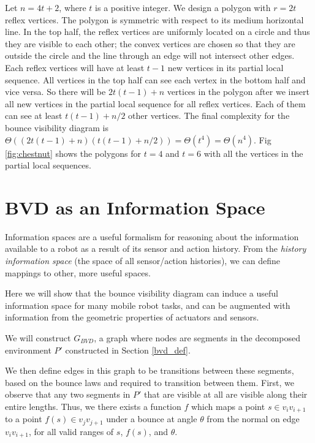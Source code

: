 \documentclass[]{article}  %
\begin{document}
Let $n = 4t+2$, where $t$ is a positive integer. We design a polygon with
$r = 2t$ reflex vertices. The polygon is symmetric with respect to its medium
horizontal line. In the top half, the reflex vertices are uniformly located on a
circle and thus they are visible to each other; the convex vertices are chosen
so that they are outside the circle and the line through an edge will not
intersect other edges. Each reflex vertices will have at least $t-1$ new
vertices in its partial local sequence. All vertices in the top half can see
each vertex in the bottom half and vice versa. So there will be $2t(t-1)+n$
vertices in the polygon after we insert all new vertices in the partial local
sequence for all reflex vertices. Each of them can see at least $t(t-1)+n/2$
other vertices. The final complexity for the bounce visibility diagram is
$\Theta ((2t(t-1)+n)(t(t-1)+n/2)) = \Theta (t^4) = \Theta(n^4)$.
Fig \ref{fig:chestnut} shows the polygons for $t = 4$ and $t=6$ with all the
vertices in the partial local sequences. %



\section{BVD as an Information Space \label{bvd_info}}

Information spaces \cite{tovar2005information} are a useful formalism for
reasoning about the information available to a robot as a result of its sensor
and action history. From the \emph{history information space} (the space of all
sensor/action histories), we can define mappings to other, more useful spaces.

Here we will show that the bounce visibility diagram can induce a useful
information space for many mobile robot tasks, and can be augmented with
information from the geometric properties of actuators and sensors.

We will construct $G_{BVD}$, a graph where nodes are segments in the decomposed
environment $P'$ constructed in Section \ref{bvd_def}.

We then define edges in this graph to be transitions between these segments, based on the bounce laws and
required to transition between them. First, we observe that any two segments in
$P'$ that are visible at all are visible along their entire lengths. Thus, we
there exists a function $f$ which maps a point $s \in v_i
v_{i+1}$ to a point $f(s) \in v_j v_{j+1}$ under a bounce at angle $\theta$ from
the normal on edge $v_i v_{i+1}$, for all valid ranges of $s$, $f(s)$, and
$\theta$.
\end{document}
